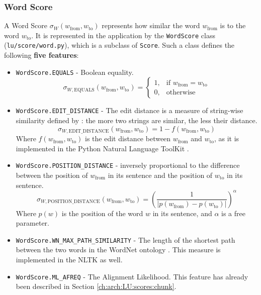 \subsubsection{Word Score} \label{ch:arch:LU:scores:word}
A Word Score $\sigma_W(w_\text{from},w_\text{to})$ represents how similar the word $w_\text{from}$ is to the word $w_\text{to}$. It is represented in the application by the \texttt{WordScore} class (\texttt{lu/score/word.py}), which is a subclass of \texttt{Score}. Such a class defines the following \textbf{five features}:
\begin{itemize}
	\item \texttt{WordScore.EQUALS} - Boolean equality.
	\begin{displaymath}
		\sigma_{W,\text{EQUALS}}(w_\text{from},w_\text{to}) = \begin{cases} 1, & \mbox{if } w_\text{from} = w_\text{to} \\
		                                                                    0, & \mbox{otherwise} \end{cases}
	\end{displaymath}
	
	\item \texttt{WordScore.EDIT\_DISTANCE} - The edit distance is a measure of string-wise similarity defined by \cite{levelshtein-66-binary}: the more two strings are similar, the less their distance.
	\begin{displaymath}
		\sigma_{W,\text{EDIT\_DISTANCE}}(w_\text{from},w_\text{to}) = 1-f(w_\text{from},w_\text{to})
	\end{displaymath}
	Where $f(w_\text{from},w_\text{to})$ is the edit distance between $w_\text{from}$ and $w_\text{to}$, as it is implemented in the Python Natural Language ToolKit \citep{Loper:2002:NNL:1118108.1118117}.
	
	\item \texttt{WordScore.POSITION\_DISTANCE} - inversely proportional to the difference between the position of $w_\text{from}$ in its sentence and the position of $w_\text{to}$ in its sentence.
	\begin{displaymath}
		\sigma_{W,\text{POSITION\_DISTANCE}}(w_\text{from},w_\text{to}) = \left(\frac{1}{|p(w_\text{from})-p(w_\text{to})|}\right)^\alpha
	\end{displaymath}
	Where $p(w)$ is the position of the word $w$ in its sentence, and $\alpha$ is a free parameter.
	
	\item \texttt{WordScore.WN\_MAX\_PATH\_SIMILARITY} - The length of the shortest path between the two words in the WordNet ontology \citep{Miller:1995:WLD:219717.219748}. This measure is implemented in the NLTK as well.
	
	\item \texttt{WordScore.ML\_AFREQ} - The Alignment Likelihood. This feature has already been described in Section \ref{ch:arch:LU:scores:chunk}.
\end{itemize}

